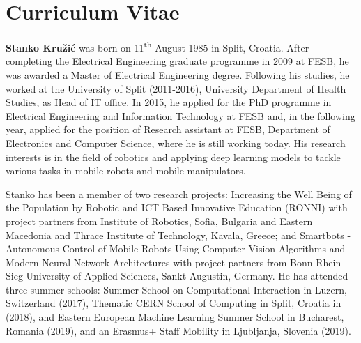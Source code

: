 

\newpage \mbox{} \newpage \pagestyle{empty}

\section*{Curriculum Vitae}

\vspace{15mm}

{\noindent\bf{Stanko Kružić}} was born on 11\textsuperscript{th} August 1985 in Split, Croatia. After completing the Electrical Engineering graduate programme in 2009 at FESB, he was awarded a Master of Electrical Engineering degree. Following his studies, he worked at the University of Split (2011-2016), University Department of Health Studies, as Head of IT office. In 2015, he applied for the PhD programme in Electrical Engineering and Information Technology at FESB and, in the following year, applied for the position of Research assistant at FESB, Department of Electronics and Computer Science, where he is still working today. His research interests is in the field of robotics and applying deep learning models to tackle various tasks in mobile robots and mobile manipulators. 

\noindent Stanko has been a member of two research projects: Increasing the Well Being of the Population by Robotic and ICT Based Innovative Education (RONNI) with project partners from Institute of Robotics, Sofia, Bulgaria and Eastern Macedonia and Thrace Institute of Technology, Kavala, Greece; and Smartbots - Autonomous Control of Mobile Robots Using Computer Vision Algorithms and Modern Neural Network Architectures with project partners from Bonn-Rhein-Sieg University of Applied Sciences, Sankt Augustin, Germany. He has attended three summer schools: Summer School on Computational Interaction in Luzern, Switzerland (2017), Thematic CERN School of Computing in Split, Croatia in (2018), and Eastern European Machine Learning Summer School in Bucharest, Romania (2019), and an Erasmus+ Staff Mobility in Ljubljanja, Slovenia (2019).

